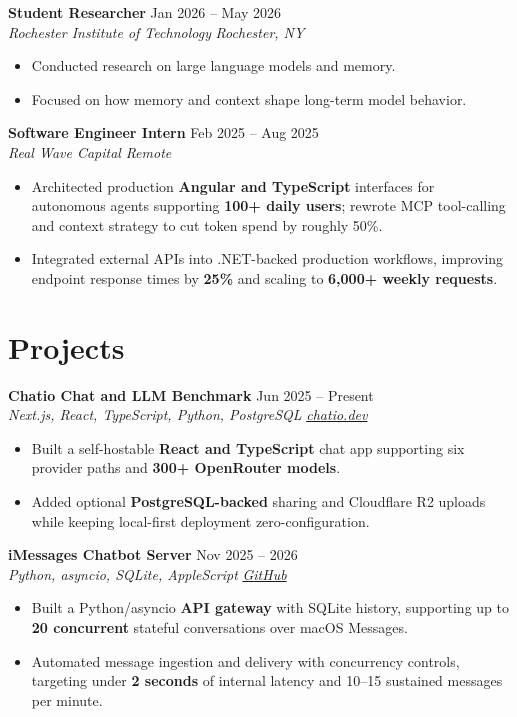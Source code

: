 \documentclass[10pt,letterpaper]{article}
\newif\ifresumeFirstRole
\newcommand{\resumeRole}[4]{%
  \ifresumeFirstRole
    \global\resumeFirstRolefalse
  \else
    \vspace{0pt plus 1fill}%
  \fi
  \textbf{#1} \hfill #2\\
  \textit{#3} \hfill \textit{#4}
}
\begin{document}
\resumeRole{Student Researcher}{Jan 2026 -- May 2026}{Rochester Institute of Technology}{Rochester, NY}
\begin{itemize}
  \item Conducted research on large language models and memory.
  \item Focused on how memory and context shape long-term model behavior.
\end{itemize}

\resumeRole{Software Engineer Intern}{Feb 2025 -- Aug 2025}{Real Wave Capital}{Remote}
\begin{itemize}
  \item Architected production \textbf{Angular and TypeScript} interfaces for autonomous agents supporting \textbf{100+ daily users}; rewrote MCP tool-calling and context strategy to cut token spend by roughly 50\%.
  \item Integrated external APIs into .NET-backed production workflows, improving endpoint response times by \textbf{25\%} and scaling to \textbf{6,000+ weekly requests}.
\end{itemize}

\section*{Projects}
\resumeRole{Chatio Chat and LLM Benchmark}{Jun 2025 -- Present}{Next.js, React, TypeScript, Python, PostgreSQL}{\href{https://chatio.dev}{chatio.dev}}
\begin{itemize}
  \item Built a self-hostable \textbf{React and TypeScript} chat app supporting six provider paths and \textbf{300+ OpenRouter models}.
  \item Added optional \textbf{PostgreSQL-backed} sharing and Cloudflare R2 uploads while keeping local-first deployment zero-configuration.
\end{itemize}

\resumeRole{iMessages Chatbot Server}{Nov 2025 -- 2026}{Python, asyncio, SQLite, AppleScript}{\href{https://github.com/alextyhwang/iMessages-Chatbot-Server}{GitHub}}
\begin{itemize}
  \item Built a Python/asyncio \textbf{API gateway} with SQLite history, supporting up to \textbf{20 concurrent} stateful conversations over macOS Messages.
  \item Automated message ingestion and delivery with concurrency controls, targeting under \textbf{2 seconds} of internal latency and 10--15 sustained messages per minute.
\end{itemize}
\end{document}
